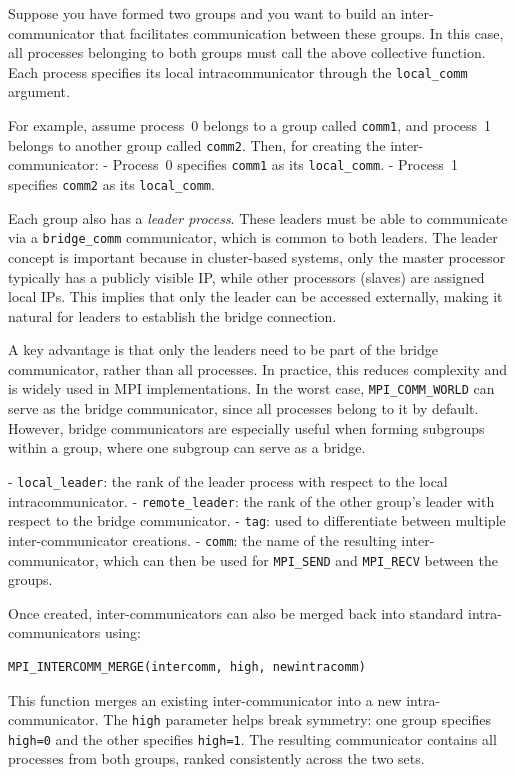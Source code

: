 \documentclass[12pt]{book}
\begin{document}
Suppose you have formed two groups and you want to build an inter-communicator that facilitates communication between these groups. In this case, all processes belonging to both groups must call the above collective function. Each process specifies its local intracommunicator through the \texttt{local\_comm} argument.  

For example, assume process~0 belongs to a group called \texttt{comm1}, and process~1 belongs to another group called \texttt{comm2}. Then, for creating the inter-communicator:
- Process~0 specifies \texttt{comm1} as its \texttt{local\_comm}.
- Process~1 specifies \texttt{comm2} as its \texttt{local\_comm}.

Each group also has a \textit{leader process}. These leaders must be able to communicate via a \texttt{bridge\_comm} communicator, which is common to both leaders. The leader concept is important because in cluster-based systems, only the master processor typically has a publicly visible IP, while other processors (slaves) are assigned local IPs. This implies that only the leader can be accessed externally, making it natural for leaders to establish the bridge connection.

A key advantage is that only the leaders need to be part of the bridge communicator, rather than all processes. In practice, this reduces complexity and is widely used in MPI implementations. In the worst case, \texttt{MPI\_COMM\_WORLD} can serve as the bridge communicator, since all processes belong to it by default. However, bridge communicators are especially useful when forming subgroups within a group, where one subgroup can serve as a bridge.

- \texttt{local\_leader}: the rank of the leader process with respect to the local intracommunicator.  
- \texttt{remote\_leader}: the rank of the other group’s leader with respect to the bridge communicator.  
- \texttt{tag}: used to differentiate between multiple inter-communicator creations.  
- \texttt{comm}: the name of the resulting inter-communicator, which can then be used for \texttt{MPI\_SEND} and \texttt{MPI\_RECV} between the groups.  

Once created, inter-communicators can also be merged back into standard intra-communicators using:

\begin{lstlisting}[style=cppstyle]
MPI_INTERCOMM_MERGE(intercomm, high, newintracomm)
\end{lstlisting}

This function merges an existing inter-communicator into a new intra-communicator. The \texttt{high} parameter helps break symmetry: one group specifies \texttt{high=0} and the other specifies \texttt{high=1}. The resulting communicator contains all processes from both groups, ranked consistently across the two sets.
\end{document}
